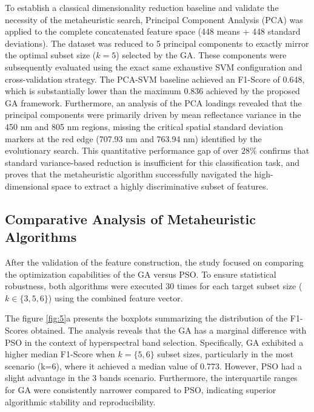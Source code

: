 \documentclass[runningheads]{llncs}
\begin{document}
To establish a classical dimensionality reduction baseline and validate the necessity of the metaheuristic search, Principal Component Analysis (PCA) was applied to the complete concatenated feature space (448 means + 448 standard deviations). The dataset was reduced to 5 principal components to exactly mirror the optimal subset size ($k=5$) selected by the GA. These components were subsequently evaluated using the exact same exhaustive SVM configuration and cross-validation strategy. The PCA-SVM baseline achieved an F1-Score of 0.648, which is substantially lower than the maximum 0.836 achieved by the proposed GA framework. Furthermore, an analysis of the PCA loadings revealed that the principal components were primarily driven by mean reflectance variance in the 450 nm and 805 nm regions, missing the critical spatial standard deviation markers at the red edge (707.93 nm and 763.94 nm) identified by the evolutionary search. This quantitative performance gap of over $28\%$ confirms that standard variance-based reduction is insufficient for this classification task, and proves that the metaheuristic algorithm successfully navigated the high-dimensional space to extract a highly discriminative subset of features.

\subsection{Comparative Analysis of Metaheuristic Algorithms}
After the validation of the feature construction, the study focused on comparing the optimization capabilities of the GA versus PSO. 
To ensure statistical robustness, both algorithms were executed 30 times for each target subset size ($k\in\{3,5,6\}$) using the combined feature vector.

The figure \ref{fig:5}a presents the boxplots summarizing the distribution of the F1-Scores obtained. 
The analysis reveals that the GA has a marginal difference with PSO in the context of hyperspectral band selection. 
Specifically, GA exhibited a higher median F1-Score when $k=\{5, 6\}$ subset sizes, particularly in the most scenario (k=6), where it achieved a median value of 0.773. 
However, PSO had a slight advantage in the 3 bands scenario. 
Furthermore, the interquartile ranges for GA were consistently narrower compared to PSO, indicating superior algorithmic stability and reproducibility.
\end{document}
